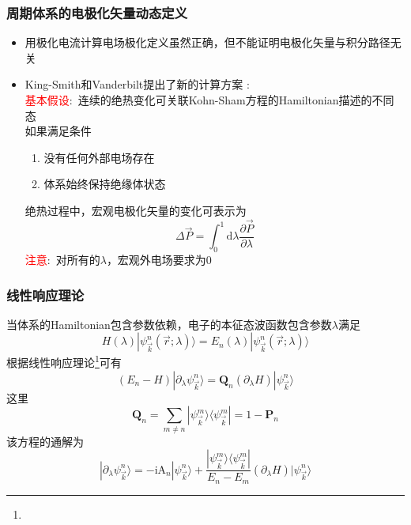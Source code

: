 \frame
{
	\frametitle{周期体系的电极化矢量动态定义}
	\begin{itemize}
		\item 用极化电流计算电场极化定义虽然正确，但不能证明电极化矢量与积分路径无关
		\item \textrm{King-Smith}和\textrm{Vanderbilt}提出了新的计算方案%
			:\\
		\textcolor{red}{基本假设}:~连续的绝热变化可关联\textrm{Kohn-Sham}方程的\textrm{Hamiltonian}描述的不同态\\如果满足条件
	\begin{enumerate}
\setlength{\itemsep}{10pt}
		\item 没有任何外部电场存在 
		\item 体系始终保持绝缘体状态
	\end{enumerate}
	绝热过程中，宏观电极化矢量的变化可表示为
	\begin{displaymath}
		\Delta\vec P=\int_0^1\mathrm{d}\lambda\frac{\partial\vec P}{\partial\lambda}
	\end{displaymath}
	\textcolor{red}{注意}:~对所有的$\lambda$，宏观外电场要求为0
	\end{itemize}
}

\frame
{
	\frametitle{线性响应理论}
	当体系的\textrm{Hamiltonian}包含参数依赖，电子的本征态波函数包含参数$\lambda$满足
	\begin{displaymath}
		H(\lambda)|\psi_{\vec k}^{n}(\vec r;\lambda)\rangle=E_n(\lambda)|\psi_{\vec k}^{n}(\vec r;\lambda)\rangle
	\end{displaymath}
	根据线性响应理论\footnote{\fontsize{6.0pt}{3.2pt}}可有
	\begin{displaymath}
		(E_n-H)|\partial_{\lambda}\psi_{\vec k}^{n}\rangle=\mathbf{Q}_n(\partial_{\lambda}H)|\psi_{\vec k}^{n}\rangle
	\end{displaymath}
	这里
	\begin{displaymath}
		\mathbf{Q}_n=\sum_{m\neq n}|\psi_{\vec k}^{m}\rangle\langle\psi_{\vec k}^{m}|=1-\mathbf{P}_n
	\end{displaymath}
	该方程的通解为
	\begin{displaymath}
		|\partial_{\lambda}\psi_{\vec k}^{n}\rangle=-\mathrm{i}\mathrm{A}_n|\psi_{\vec k}^{n}\rangle+\dfrac{|\psi_{\vec k}^{m}\rangle\langle\psi_{\vec k}^{m}|}{E_n-E_m}(\partial_{\lambda}H)|\psi_{\vec k}^{n}\rangle
	\end{displaymath}
}


